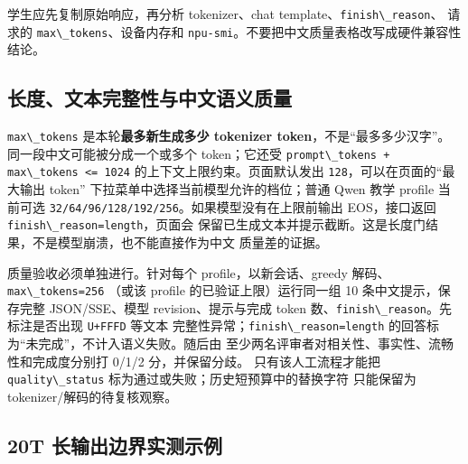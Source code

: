 学生应先复制原始响应，再分析 tokenizer、chat
template、\passthrough{\lstinline!finish\_reason!}、 请求的
\passthrough{\lstinline!max\_tokens!}、设备内存和
\passthrough{\lstinline!npu-smi!}。不要把中文质量表格改写成硬件兼容性结论。

\subsection{长度、文本完整性与中文语义质量}\label{ux957fux5ea6ux6587ux672cux5b8cux6574ux6027ux4e0eux4e2dux6587ux8bedux4e49ux8d28ux91cf}

\passthrough{\lstinline!max\_tokens!} 是本轮\textbf{最多新生成多少
tokenizer token}，不是``最多多少汉字''。 同一段中文可能被分成一个或多个
token；它还受
\passthrough{\lstinline!prompt\_tokens + max\_tokens <= 1024!}
的上下文上限约束。页面默认发出
\passthrough{\lstinline!128!}，可以在页面的``最大输出 token''
下拉菜单中选择当前模型允许的档位；普通 Qwen 教学 profile 当前可选
\passthrough{\lstinline!32/64/96/128/192/256!}。如果模型没有在上限前输出
EOS，接口返回 \passthrough{\lstinline!finish\_reason=length!}，页面会
保留已生成文本并提示截断。这是长度门结果，不是模型崩溃，也不能直接作为中文
质量差的证据。

质量验收必须单独进行。针对每个 profile，以新会话、greedy
解码、\passthrough{\lstinline!max\_tokens=256!} （或该 profile
的已验证上限）运行同一组 10 条中文提示，保存完整 JSON/SSE、模型
revision、提示与完成 token
数、\passthrough{\lstinline!finish\_reason!}。先标注是否出现
\passthrough{\lstinline!U+FFFD!} 等文本
完整性异常；\passthrough{\lstinline!finish\_reason=length!}
的回答标为``未完成''，不计入语义失败。随后由
至少两名评审者对相关性、事实性、流畅性和完成度分别打 0/1/2
分，并保留分歧。 只有该人工流程才能把
\passthrough{\lstinline!quality\_status!}
标为通过或失败；历史短预算中的替换字符 只能保留为
tokenizer/解码的待复核观察。

\subsection{20T
长输出边界实测示例}\label{t-ux957fux8f93ux51faux8fb9ux754cux5b9eux6d4bux793aux4f8b}

